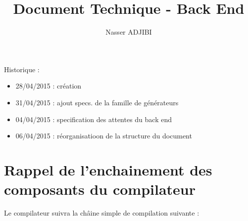 \documentclass{article}
\title{Document Technique - Back End}
\author{Nasser ADJIBI}
\begin{document}
\maketitle

Historique :
\begin{itemize}
 \item 28/04/2015 : création
 \item 31/04/2015 : ajout specs. de la famille de générateurs
 \item 04/04/2015 : specification des attentes du back end
 \item 06/04/2015 : réorganisatioon de la structure du document

\end{itemize}

\newpage
\tableofcontents
\newpage


\section{Rappel de l'enchainement des composants du compilateur}

Le compilateur suivra la châine simple de compilation suivante :
\end{document}
